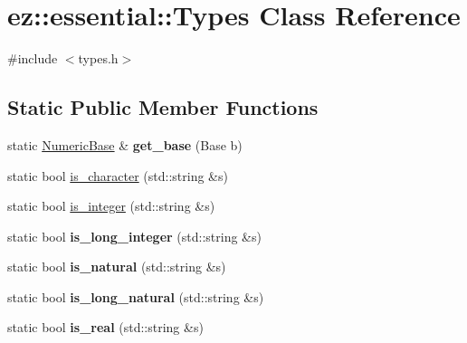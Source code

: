 \hypertarget{classez_1_1essential_1_1Types}{}\section{ez\+:\+:essential\+:\+:Types Class Reference}
\label{classez_1_1essential_1_1Types}


{\ttfamily \#include $<$types.\+h$>$}

\subsection*{Static Public Member Functions}
\begin{DoxyCompactItemize}
\item 
\mbox{\label{classez_1_1essential_1_1Types_a2cef0095ded78028af331dee0da3edd8}} 
static \hyperlink{classez_1_1essential_1_1NumericBase}{Numeric\+Base} \& {\bfseries get\+\_\+base} (Base b)
\item 
static bool \hyperlink{classez_1_1essential_1_1Types_ad46e322aa2c257713684c0590832e0cb}{is\+\_\+character} (std\+::string \&s)
\item 
static bool \hyperlink{classez_1_1essential_1_1Types_a76ecf067792f8e456977bb3238868a6c}{is\+\_\+integer} (std\+::string \&s)
\item 
\mbox{\label{classez_1_1essential_1_1Types_a06c9c2a4c77c65e99bac86cf5e0ed076}} 
static bool {\bfseries is\+\_\+long\+\_\+integer} (std\+::string \&s)
\item 
\mbox{\label{classez_1_1essential_1_1Types_ade066109b6a6efa2689f52f6b7a21861}} 
static bool {\bfseries is\+\_\+natural} (std\+::string \&s)
\item 
\mbox{\label{classez_1_1essential_1_1Types_a7a96976bfeb5403adcd46b8e4a73c50b}} 
static bool {\bfseries is\+\_\+long\+\_\+natural} (std\+::string \&s)
\item 
\mbox{\label{classez_1_1essential_1_1Types_a696af3c121c07b082d94159c901e1f11}} 
static bool {\bfseries is\+\_\+real} (std\+::string \&s)
\item 
\mbox{\label{classez_1_1essential_1_1Types_a30cdd5ef59f835662601c6969471327e}} 

\end{DoxyCompactItemize}
